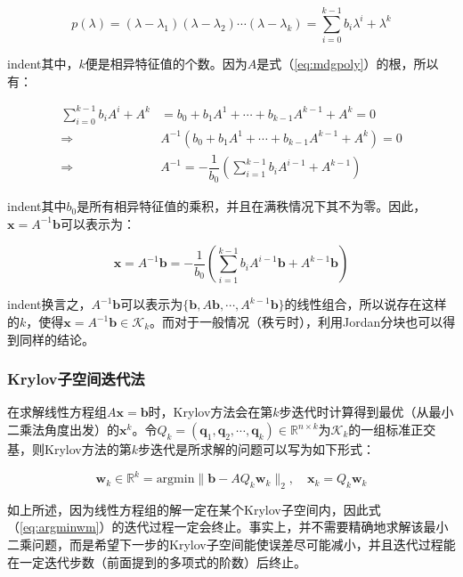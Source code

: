 \documentclass[UTF8,nofonts]{ctexart}
\begin{document}
\begin{equation}
\label{eq:mdgpoly}
p(\lambda)=(\lambda-\lambda_1)(\lambda-\lambda_2)\cdots(\lambda-\lambda_k)=\sum_{i=0}^{k-1}b_i\lambda^i+\lambda^k
\end{equation}

indent其中，$k$便是相异特征值的个数。因为$A$是式（\ref{eq:mdgpoly}）的根，所以有：

\[
\begin{aligned}
\sum_{i=0}^{k-1}b_iA^i+A^k &= b_0+b_1A^1+\cdots+b_{k-1}A^{k-1}+A^k=0 \\
\Longrightarrow\quad & A^{-1}(b_0+b_1A^{1}+\cdots+b_{k-1}A^{k-1}+A^k)=0 \\
\Longrightarrow\quad & A^{-1}=-\dfrac{1}{b_0}\left(\sum_{i=1}^{k-1}b_iA^{i-1}+A^{k-1}\right)
\end{aligned}
\]

indent其中$b_0$是所有相异特征值的乘积，并且在满秩情况下其不为零。因此，$\boldsymbol{x}=A^{-1}\boldsymbol{b}$可以表示为：

\[
\boldsymbol{x}=A^{-1}\boldsymbol{b}=-\dfrac{1}{b_0}\left(\sum_{i=1}^{k-1}b_iA^{i-1}\boldsymbol{b}+A^{k-1}\boldsymbol{b}\right)
\]

indent换言之，$A^{-1}\boldsymbol{b}$可以表示为$\{\boldsymbol{b},A\boldsymbol{b},\cdots,A^{k-1}\boldsymbol{b}\}$的线性组合，所以说存在这样的$k$，使得$\boldsymbol{x}=A^{-1}\boldsymbol{b}\in\mathcal{K}_k$。而对于一般情况（秩亏时），利用Jordan分块也可以得到同样的结论。

\subsubsection*{Krylov子空间迭代法}

在求解线性方程组$A\boldsymbol{x}=\boldsymbol{b}$时，Krylov方法会在第$k$步迭代时计算得到最优（从最小二乘法角度出发）的$\boldsymbol{x}^k$。令$Q_k=(\boldsymbol{q}_1,\boldsymbol{q}_2,\cdots,\boldsymbol{q}_k)\in\mathbb{R}^{n\times k}$为$\mathcal{K}_k$的一组标准正交基，则Krylov方法的第$k$步迭代是所求解的问题可以写为如下形式：

\begin{equation}
\label{eq:argminwm}
\boldsymbol{w}_k\in\mathbb{R}^k=\text{argmin}\|\boldsymbol{b}-AQ_k\boldsymbol{w}_k\|_2,\quad\boldsymbol{x}_k=Q_k\boldsymbol{w}_k
\end{equation}

如上所述，因为线性方程组的解一定在某个Krylov子空间内，因此式（\ref{eq:argminwm}）的迭代过程一定会终止。事实上，并不需要精确地求解该最小二乘问题，而是希望下一步的Krylov子空间能使误差尽可能减小，并且迭代过程能在一定迭代步数（前面提到的多项式的阶数）后终止。
\end{document}

